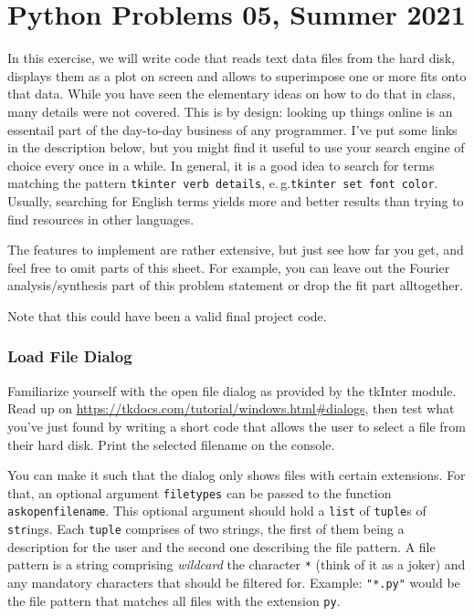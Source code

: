 \documentclass[
	english,
	fontsize=10pt,
	parskip=half,
	titlepage=true,
	DIV=12
]{scrartcl}
\newcommand*{\inPy}[1]{\texttt{#1}}
\newcommand*{\eg}{e.\,g.\xspace}
\begin{document}
\part*{Python Problems 05, Summer 2021}
In this exercise, we will write code that reads text data files from the hard disk, displays them as a plot on screen and allows to superimpose one or more fits onto that data. While you have seen the elementary ideas on how to do that in class, many details were not covered. This is by design: looking up things online is an essentail part of the day-to-day business of any programmer. I've put some links in the description below, but you might find it useful to use your search engine of choice every once in a while. In general, it is a good idea to search for terms matching the pattern \texttt{tkinter verb details}, \eg \texttt{tkinter set font color}. Usually, searching for English terms yields more and better results than trying to find resources in other languages.

The features to implement are rather extensive, but just see how far you get, and feel free to omit parts of this sheet. For example, you can leave out the Fourier analysis/synthesis part of this problem statement or drop the fit part alltogether.

Note that this could have been a valid final project code.

\section{Load File Dialog}
Familiarize yourself with the open file dialog as provided by the tkInter module. Read up on \url{https://tkdocs.com/tutorial/windows.html#dialogs}, then test what you've just found by writing a short code that allows the user to select a file from their hard disk. Print the selected filename on the console.

You can make it such that the dialog only shows files with certain extensions. For that, an optional argument \texttt{filetypes} can be passed to the function \texttt{askopenfilename}. This optional argument should hold a \inPy{list} of \inPy{tuple}s of \inPy{str}ings. Each \inPy{tuple} comprises of two strings, the first of them being a description for the user and the second one describing the file pattern. A file pattern is a string comprising \emph{wildcard} the character \texttt{*} (think of it as a joker) and any mandatory characters that should be filtered for. Example: \inPy{"*.py"} would be the file pattern that matches all files with the extension \texttt{py}.
\end{document}
